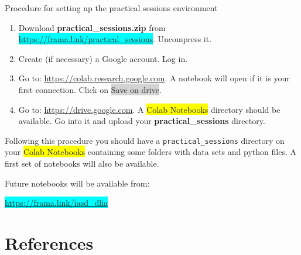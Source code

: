 \documentclass[xcolor=pdftex,dvipsnames,table,mathserif]{beamer}
\begin{document}
\begin{frame}{Procedure for setting up the practical sessions environment}

  \scriptsize

  \begin{enumerate}
  \item Download \textbf{practical\_sessions.zip} from \colorbox{cyan}{\url{https://frama.link/practical\_sessions}}. Uncompress it.
  \item Create (if necessary) a Google account. Log in.
  \item Go to: \url{https://colab.research.google.com}. A notebook will open if it is your first connection. Click on \colorbox{lightgray}{Save on drive}.
  \item Go to: \url{https://drive.google.com}. A \colorbox{yellow}{Colab Notebooks} directory should be available. Go into it and upload your \textbf{practical\_sessions} directory.
  \end{enumerate}

  Following this procedure you should have a \texttt{practical\_sessions} directory on your \colorbox{yellow}{Colab Notebooks} containing some folders with data sets and python files. A first set of notebooks will also be available.

  \vspace{1em}

  Future notebooks will be available from:

  \centering

  \colorbox{cyan}{\url{https://frama.link/iasd_dlia}}


\end{frame}



\section*{References}



\end{document}
